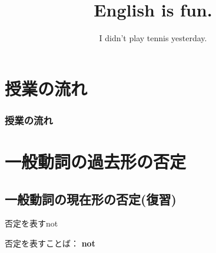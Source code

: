 \documentclass[aspectratio=169,xcolor={dvipsnames,table}]{beamer}
\title{English is fun.}
\subtitle{I didn't play tennis yesterday.}
\author{}
\institute[]{}
\date[]
\begin{document}
\begin{frame}[plain]
  \titlepage
\end{frame}
\section*{授業の流れ}
\begin{frame}[plain]
  \frametitle{授業の流れ}
  \tableofcontents
\end{frame}
\section{一般動詞の過去形の否定}
\subsection{一般動詞の現在形の否定(復習)}
\begin{frame}[plain]{否定を表すnot}
 \Large

否定を表すことば： {\LARGE\bfseries not}\hspace{20pt}
\end{frame}
\end{document}
